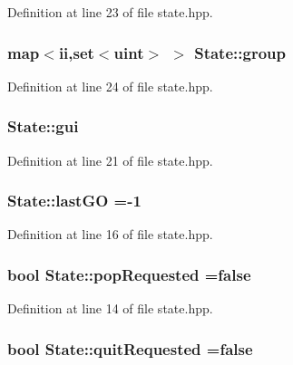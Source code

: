 Definition at line 23 of file state.\-hpp.

\hypertarget{class_state_a18dfb560751c969cf8d6583b55fa2885}{
\subsubsection[{group}]{\setlength{\rightskip}{0pt plus 5cm}map$<${\bf ii},set$<${\bf uint}$>$ $>$ State\-::group}}\label{class_state_a18dfb560751c969cf8d6583b55fa2885}


Definition at line 24 of file state.\-hpp.

\hypertarget{class_state_aca632a80920808dc1aad399ec560f84f}{
\subsubsection[{gui}]{ State\-::gui}}\label{class_state_aca632a80920808dc1aad399ec560f84f}


Definition at line 21 of file state.\-hpp.

\hypertarget{class_state_a58985523afb5266a35c726b50b0df75c}{
\subsubsection[{last\-G\-O}]{ State\-::last\-G\-O =-\/1\hspace{0.3cm}{\ttfamily [protected]}}}\label{class_state_a58985523afb5266a35c726b50b0df75c}


Definition at line 16 of file state.\-hpp.

\hypertarget{class_state_a9d7c1082cc6592646acec05a6e46f145}{
\subsubsection[{pop\-Requested}]{\setlength{\rightskip}{0pt plus 5cm}bool State\-::pop\-Requested =false\hspace{0.3cm}{\ttfamily [protected]}}}\label{class_state_a9d7c1082cc6592646acec05a6e46f145}


Definition at line 14 of file state.\-hpp.

\hypertarget{class_state_aa96884ddc05e8f23841298af662ae733}{
\subsubsection[{quit\-Requested}]{\setlength{\rightskip}{0pt plus 5cm}bool State\-::quit\-Requested =false\hspace{0.3cm}{\ttfamily [protected]}}}\label{class_state_aa96884ddc05e8f23841298af662ae733}


